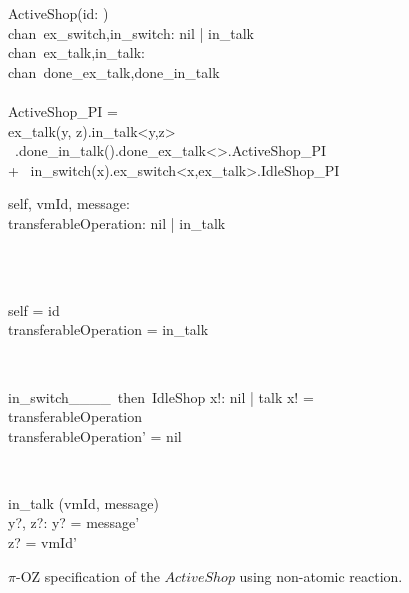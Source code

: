 \begin{figure}[H]
\centering
\begin{class}{ActiveShop(id: \integer)}
\ 
\\chan\ ex\_switch,in\_switch: nil | in\_talk
\ 
\\chan\ ex\_talk,in\_talk:\integer \times \integer
\ 
\\chan\ done\_ex\_talk,done\_in\_talk
\ \\ \
\\ActiveShop\_PI = 
\\ \qquad ex\_talk(y, z).in\_talk<y,z>
\\ \ \qquad \qquad \qquad .done\_in\_talk().done\_ex\_talk<>.ActiveShop\_PI 
\\ \qquad + \ in\_switch(x).ex\_switch<x,ex\_talk>.IdleShop\_PI
\\\begin{state}
self, vmId, message: \integer
\\transferableOperation: nil | in\_talk
\end{state} 
\\
\begin{init}
\\self = id
\\transferableOperation = in\_talk
\end{init} 
\\
\begin{op}{in\_switch\_\_\_\_\ then\ IdleShop}
x!: nil | talk
\ST
x! = transferableOperation
\\transferableOperation' = nil
\end{op}
\\
\begin{op}{in\_talk}
\Delta (vmId, message)
\\y?, z?: \integer
\ST
y? = message'
\\z? = vmId'
\end{op}
\end{class}
\caption{$\pi$-OZ specification of the $ActiveShop$ using non-atomic reaction.}
\label{comp_oz_pi_statefull_activeShop_non_atomic}
\end{figure}